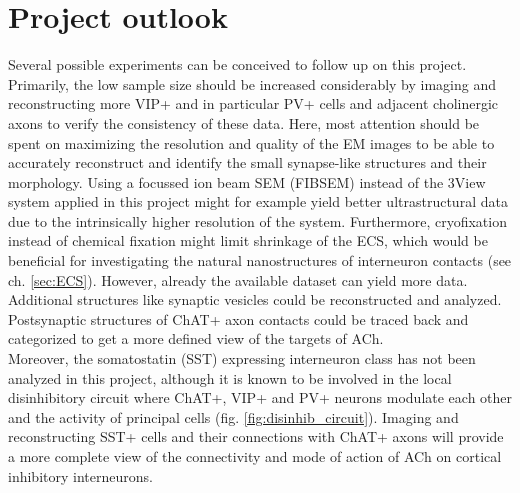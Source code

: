 \section{Project outlook}
\label{sec:outlook}
Several possible experiments can be conceived to follow up on this project. Primarily, the low sample size should be increased considerably by imaging and reconstructing more VIP+ and in particular PV+ cells and adjacent cholinergic axons to verify the consistency of these data. Here, most attention should be spent on maximizing the resolution and quality of the EM images to be able to accurately reconstruct and identify the small synapse-like structures and their morphology. Using a focussed ion beam SEM (FIBSEM) instead of the 3View system applied in this project might for example yield better ultrastructural data due to the intrinsically higher resolution of the system. Furthermore, cryofixation instead of chemical fixation might limit shrinkage of the ECS, which would be beneficial for investigating the natural nanostructures of interneuron contacts (see ch. \ref{sec:ECS}).
However, already the available dataset can yield more data. Additional structures like synaptic vesicles could be reconstructed and analyzed. Postsynaptic structures of ChAT+ axon contacts could be traced back and categorized to get a more defined view of the targets of ACh. \\
Moreover, the somatostatin (SST) expressing interneuron class has not been analyzed in this project, although it is known to be involved in the local disinhibitory circuit where ChAT+, VIP+ and PV+ neurons modulate each other and the activity of principal cells (fig. \ref{fig:disinhib_circuit}). Imaging and reconstructing SST+ cells and their connections with ChAT+ axons will provide a more complete view of the connectivity and mode of action of ACh on cortical inhibitory interneurons.

